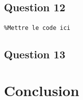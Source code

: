 \documentclass[a4paper,11pt]{article}
\begin{document}
\subsection{Question 12}
\begin{verbatim}
%Mettre le code ici
\end{verbatim}

\subsection{Question 13}

\section{Conclusion}
\end{document}
